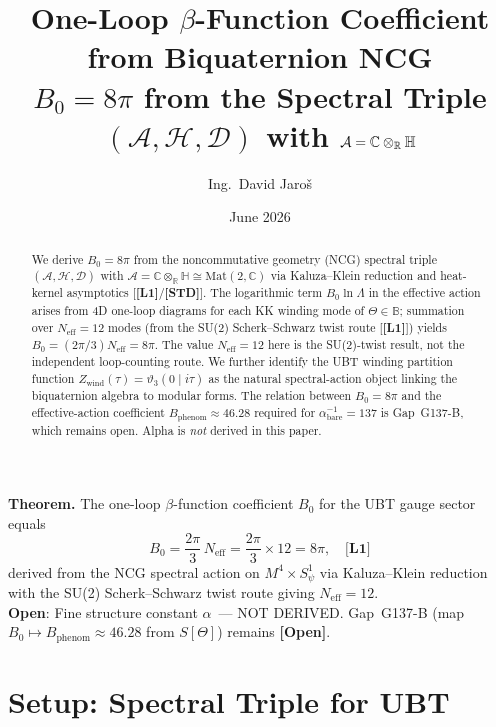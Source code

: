 \documentclass[12pt,a4paper]{article}
\title{\textbf{One-Loop $\beta$-Function Coefficient from Biquaternion NCG}\\[4pt]
       {\large $B_0 = 8\pi$ from the Spectral Triple $(\mathcal{A},\mathcal{H},\mathcal{D})$
        with $\mathcal{A}=\CC\otimes_\mathbb{R}\HH$}}
\author{Ing.\ David Jaro\v{s}}
\date{June 2026}
\theoremstyle{definition}
\theoremstyle{remark}
\newcommand{\OPEN}{\textbf{[Open]}}
\newcommand{\Lone}{\textbf{[L1]}}
\newcommand{\STD}{\textbf{[STD]}}
\newcommand{\CC}{\mathbb{C}}
\newcommand{\HH}{\mathbb{H}}
\newcommand{\Neff}{N_{\mathrm{eff}}}
\begin{document}
\maketitle


\begin{tcolorbox}[enhanced,colback=blue!4!white,colframe=blue!55!black,
  arc=3pt,boxrule=1.2pt,
  title={\textbf{\large Main Result}}]
\textbf{Theorem.}
The one-loop $\beta$-function coefficient $B_0$ for the UBT gauge sector equals
\[
B_0 = \frac{2\pi}{3}\,\Neff = \frac{2\pi}{3}\times 12 = 8\pi,\quad\textbf{[L1]}
\]
derived from the NCG spectral action on $M^4\times S^1_\psi$ via
Kaluza--Klein reduction with the SU(2) Scherk--Schwarz twist route giving
$\Neff=12$.\\[4pt]
\textbf{Open}: Fine structure constant $\alpha$\ --- NOT DERIVED.
Gap~G137-B (map $B_0\mapsto B_{\mathrm{phenom}}\approx 46.28$ from $S[\Theta]$) remains \OPEN.
\end{tcolorbox}

\begin{abstract}
We derive $B_0 = 8\pi$ from the noncommutative geometry (NCG) spectral triple
$(\mathcal{A},\mathcal{H},\mathcal{D})$ with $\mathcal{A}=\CC\otimes_\mathbb{R}\HH\cong\mathrm{Mat}(2,\CC)$
via Kaluza--Klein reduction and heat-kernel asymptotics [\Lone/\STD].
The logarithmic term $B_0\ln\Lambda$ in the effective action arises from
4D one-loop diagrams for each KK winding mode of $\Theta\in\mathbb{B}$;
summation over $\Neff=12$ modes (from the SU(2) Scherk--Schwarz twist route [\Lone])
yields $B_0=(2\pi/3)\Neff=8\pi$.
The value $\Neff=12$ here is the SU(2)-twist result, not the
independent loop-counting route.
We further identify the UBT winding partition function
$Z_{\mathrm{wind}}(\tau)=\vartheta_3(0\mid i\tau)$ as the natural spectral-action
object linking the biquaternion algebra to modular forms.
The relation between $B_0=8\pi$ and the effective-action coefficient
$B_{\mathrm{phenom}}\approx 46.28$ required for $\alpha^{-1}_{\mathrm{bare}}=137$
is Gap~G137-B, which remains open.
Alpha is \emph{not} derived in this paper.
\end{abstract}

\tableofcontents

\section{Setup: Spectral Triple for UBT}
\label{sec:setup}
\end{document}
